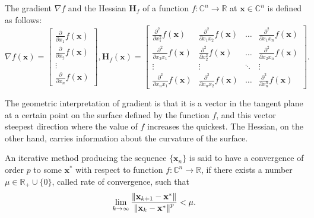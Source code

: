 \begin{tight_equations}
\begin{definition}
The gradient $\nabla f$ and the Hessian $\mathbf{H}_f$ of a function $f:\mathbb{C}^n \rightarrow \mathbb{R}$ at $\mathbf{x} \in \mathbb{C}^n$ is defined as follows:
\[\nabla f(\mathbf{x}) = \begin{bmatrix}
\frac{\partial}{\partial x_1} f(\mathbf{x}) \\ 
\frac{\partial}{\partial x_2} f(\mathbf{x}) \\ 
\vdots \\ 
\frac{\partial}{\partial x_n} f(\mathbf{x})
\end{bmatrix}, \mathbf{H}_f(\mathbf{x}) = \begin{bmatrix}
\frac{\partial^2}{\partial x_1^2} f(\mathbf{x}) & \frac{\partial^2}{\partial x_1 x_2} f(\mathbf{x}) & \ldots & \frac{\partial^2}{\partial x_1 x_n} f(\mathbf{x}) \\ 
\frac{\partial^2}{\partial x_2 x_1} f(\mathbf{x}) & \frac{\partial^2}{\partial x_2^2} f(\mathbf{x}) & \ldots & \frac{\partial^2}{\partial x_2 x_n} f(\mathbf{x}) \\ 
\vdots & \vdots & \ddots & \vdots \\ 
\frac{\partial^2}{\partial x_n x_1} f(\mathbf{x}) & \frac{\partial^2}{\partial x_n x_2} f(\mathbf{x}) & \ldots & \frac{\partial^2}{\partial x_n^n} f(\mathbf{x})
\end{bmatrix}.\]
\end{definition}

\begin{remark}
The geometric interpretation of gradient is that it is a vector in the tangent plane at a certain point on the surface defined by the function $f$, and this vector steepest direction where the value of $f$ increases the quickest. The Hessian, on the other hand, carries information about the curvature of the surface.
\end{remark}

\begin{definition}
An iterative method producing the sequence $\{\mathbf{x}_n\}$ is said to have a convergence of order $p$ to some $\mathbf{x}^*$ with respect to function $f:\mathbb{C}^n \rightarrow \mathbb{R}$, if there exists a number $\mu \in \mathbb{R}_+  \cup \{0\}$, called rate of convergence, such that
\[\lim_{k \rightarrow \infty} \frac{\left\lVert\mathbf{x}_{k+1} - \mathbf{x}^*\right\rVert}{\left\lVert\mathbf{x}_{k} - \mathbf{x}^*\right\rVert^p} < \mu.\]
\end{definition}


\end{tight_equations}
